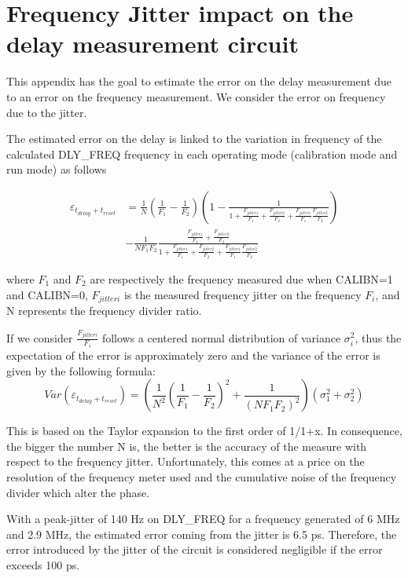 
\chapter{Frequency Jitter impact on the delay measurement circuit}
\label{app:delay_circuit_jitter}
This appendix has the goal to estimate the error on the delay measurement due to an error on the frequency measurement. We consider the error on frequency due to the jitter.

The estimated error on the delay is linked to the variation in frequency of the calculated DLY\_FREQ frequency in each operating mode (calibration mode and run mode) as follows

\begin{align}
\varepsilon_{t_{delay}+t_{reset}} &= \frac{1}{N} \left(\frac{1}{F_1}-\frac{1}{F_2} \right) \left(1 - \frac{1}{1+\frac{F_{jitter1}}{F_1}+\frac{F_{jitter2}}{F_2}+\frac{F_{jitter1}}{F_1}\frac{F_{jitter2}}{F_2}} \right) \\
&- \frac{1}{NF_1 F_2} \frac{\frac{F_{jitter1}}{F_1}+\frac{F_{jitter2}}{F_2}}{1+\frac{F_{jitter1}}{F_1}+\frac{F_{jitter2}}{F_2}+\frac{F_{jitter1}}{F_1}\frac{F_{jitter2}}{F_2}} \nonumber
\end{align}

where $F_1$ and $F_2$ are respectively the frequency measured due when CALIBN=1 and CALIBN=0, $F_{jitteri}$ is the measured frequency jitter on the frequency $F_i$, and N represents the frequency divider ratio.

If we consider $\frac{F_{jitteri}}{F_i}$ follows a centered normal distribution of variance $\sigma_i^2$, thus the expectation of the error is approximately zero and the variance of the error is given by the following formula:
\begin{equation}
Var\left(\varepsilon_{t_{delay}+t_{reset}}\right) = \left(\frac{1}{N^2} \left(\frac{1}{F_1}-\frac{1}{F_2} \right)^2 + \frac{1}{\left(NF_1F_2\right)^2} \right) \left(\sigma_1^2+\sigma_2^2 \right)
\end{equation}

This is based on the Taylor expansion to the first order of 1/1+x. In consequence, the bigger the number N is, the better is the accuracy of the measure with respect to the frequency jitter. Unfortunately, this comes at a price on the resolution of the frequency meter used and the cumulative noise of the frequency divider which alter the phase.

With a peak-jitter of 140 Hz on DLY\_FREQ for a frequency generated of 6 MHz and 2.9 MHz, the estimated error coming from the jitter is 6.5 ps. Therefore, the error introduced by the jitter of the circuit is considered negligible if the error exceeds 100 ps.
